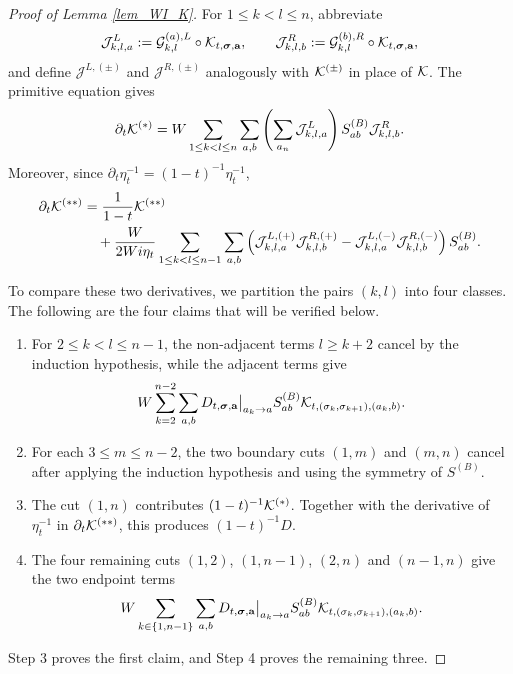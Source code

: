 \documentclass[10pt,reqno]{article}
\theoremstyle{plain} %
\theoremstyle{remark}
\numberwithin{equation}{section}
\begin{document}
\begin{proof}[Proof of Lemma \ref{lem_WI_K}]
For $1\leq k<l\leq n$, abbreviate
\[
 \mathcal J^L_{k,l,a}:={\cal G}^{(a),L}_{k,l}\circ
 {\cal K}_{t,\boldsymbol{\sigma},\textbf{a}},
 \qquad
 \mathcal J^R_{k,l,b}:={\cal G}^{(b),R}_{k,l}\circ
 {\cal K}_{t,\boldsymbol{\sigma},\textbf{a}},
\]
and define $\mathcal J^{L,(\pm)}$ and $\mathcal J^{R,(\pm)}$ analogously
with ${\cal K}^{(\pm)}$ in place of ${\cal K}$. The primitive equation gives
\begin{equation}\label{gsasawwe}
 \partial_t{\cal K}^{(*)}
 =W\sum_{1\leq k<l\leq n}\sum_{a,b}
 \left(\sum_{a_n}\mathcal J^L_{k,l,a}\right)
 S^{(B)}_{ab}\mathcal J^R_{k,l,b}.
\end{equation}
Moreover, since $\partial_t\eta_t^{-1}=(1-t)^{-1}\eta_t^{-1}$,
\begin{equation}\label{gsasawII}
\begin{aligned}
 \partial_t{\cal K}^{(**)}
 &=\frac{1}{1-t}{\cal K}^{(**)}                                  \\
 &\quad+\frac{W}{2Wi\eta_t}
 \sum_{1\leq k<l\leq n-1}\sum_{a,b}
 \left(
 \mathcal J^{L,(+)}_{k,l,a}\mathcal J^{R,(+)}_{k,l,b}
 -\mathcal J^{L,(-)}_{k,l,a}\mathcal J^{R,(-)}_{k,l,b}
 \right)S^{(B)}_{ab}.
\end{aligned}
\end{equation}

\medskip
{}
To compare these two derivatives, we partition the pairs $(k,l)$ into
four classes. The following are the four claims that will be verified
below.
\begin{enumerate}
 \item For $2\leq k<l\leq n-1$, the non-adjacent terms $l\geq k+2$
 cancel by the induction hypothesis, while the adjacent terms give
 \[
  W\sum_{k=2}^{n-2}\sum_{a,b}
  D_{t,\boldsymbol{\sigma},\textbf{a}}\big|_{a_k\to a}
  S^{(B)}_{ab}{\cal K}_{t,(\sigma_k,\sigma_{k+1}),(a_k,b)}.
 \]

 \item For each $3\leq m\leq n-2$, the two boundary cuts $(1,m)$ and
 $(m,n)$ cancel after applying the induction hypothesis and using the
 symmetry of $S^{(B)}$.

 \item The cut $(1,n)$ contributes $(1-t)^{-1}{\cal K}^{(*)}$. Together
 with the derivative of $\eta_t^{-1}$ in $\partial_t{\cal K}^{(**)}$, this
 produces $(1-t)^{-1}D$.

 \item The four remaining cuts
 $(1,2)$, $(1,n-1)$, $(2,n)$ and $(n-1,n)$ 
 give the two endpoint terms
 \[
  W\sum_{k\in\{1,n-1\}}\sum_{a,b}
  D_{t,\boldsymbol{\sigma},\textbf{a}}\big|_{a_k\to a}
  S^{(B)}_{ab}{\cal K}_{t,(\sigma_k,\sigma_{k+1}),(a_k,b)}.
 \]
\end{enumerate}
Step 3 proves the first claim, and Step 4 proves the remaining three.


\end{proof}
\end{document}
